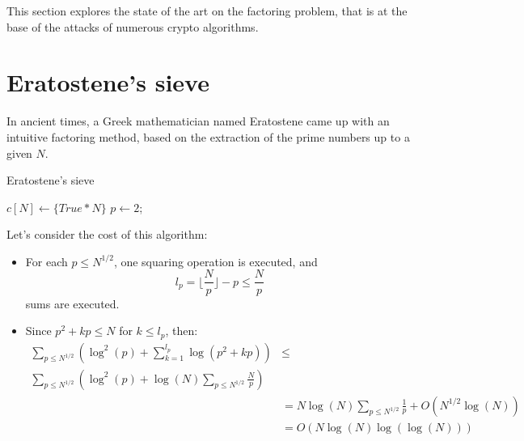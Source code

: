 This section explores the state of the art on the factoring problem, that is at the base of the attacks of numerous crypto algorithms. \newline
\section{Eratostene's sieve}
In ancient times, a Greek mathematician named Eratostene came up with an intuitive factoring method, based on the extraction of the prime numbers up to a given $N$.
\begin{algorithm}
\caption{Eratostene's sieve}\label{alg:eratostene_sieve}
$c[N] \gets \{True * N\}$\;
$p \gets 2$;
\;
\end{algorithm}
Let's consider the cost of this algorithm:
\begin{itemize}
    \item For each $p \leq N^{1/2}$, one squaring operation is executed, and
    \[
    l_{p} = \lfloor \frac{N}{p} \rfloor - p \leq \frac{N}{p}
    \]
    sums are executed.
    \item Since $p^{2} + kp \leq N$ for $k \leq l_{p}$, then:
    \begin{align*}
        \sum_{p \leq N^{1/2}} (\operatorname{log}^{2}(p) + \sum_{k=1}^{l_{p}} \operatorname{log}(p^{2} + kp)) & \leq \\
        \sum_{p \leq N^{1/2}} (\operatorname{log}^{2}(p) + \operatorname{log}(N) \sum_{p \leq N^{1/2}} \frac{N}{p})\\
        & = N \operatorname{log}(N) \sum_{p \leq N^{1/2}} \frac{1}{p} + O(N^{1/2} \operatorname{log}(N)) \\
        & = O(N \operatorname{log}(N) \operatorname{log}(\operatorname{log}(N)))
    \end{align*}
\end{itemize}

